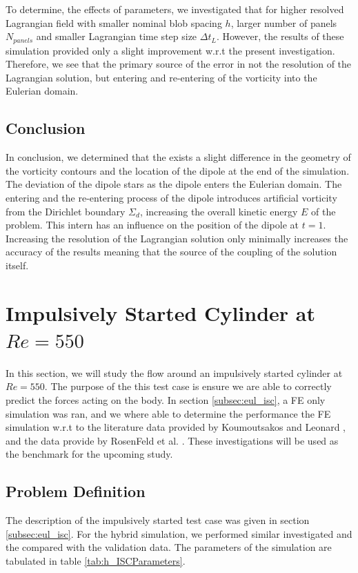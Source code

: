 To determine, the effects of parameters, we investigated that for higher resolved Lagrangian field with smaller nominal blob spacing $h$, larger number of panels $N_{panels}$ and smaller Lagrangian time step size $\Delta t_L$. However, the results of these simulation provided only a slight improvement w.r.t the present investigation. Therefore, we see that the primary source of the error in not the resolution of the Lagrangian solution, but entering and re-entering of the vorticity into the Eulerian domain.


\subsection{Conclusion}

In conclusion, we determined that the exists a slight difference in the geometry of the vorticity contours and the location of the dipole at the end of the simulation. The deviation of the dipole stars as the dipole enters the Eulerian domain. The entering and the re-entering process of the dipole introduces artificial vorticity from the Dirichlet boundary $\Sigma_d$, increasing the overall kinetic energy $E$ of the problem. This intern has an influence on the position of the dipole at $t=1$. Increasing the resolution of the Lagrangian solution only minimally increases the accuracy of the results meaning that the source of the coupling of the solution itself.  


\section{Impulsively Started Cylinder at $Re=550$}
\label{sec:vvhm-isc}
In this section, we will study the flow around an impulsively started cylinder at $Re=550$. The purpose of the this test case is ensure we are able to correctly predict the forces acting on the body. In section \ref{subsec:eul_isc}, a FE only simulation was ran, and we where able to determine the performance the FE simulation w.r.t to the literature data provided by Koumoutsakos and Leonard \cite{Koumoutsakos1995a}, and the data provide by  RosenFeld et al. \cite{MosheRosenFeldDochanKwak1991}. These investigations will be used as the benchmark for the upcoming study.

\subsection{Problem Definition}

The description of the impulsively started test case was given in section \ref{subsec:eul_isc}. For the hybrid simulation, we performed similar investigated and the compared with the validation data. The parameters of the simulation are tabulated in table \ref{tab:h_ISCParameters}. 

